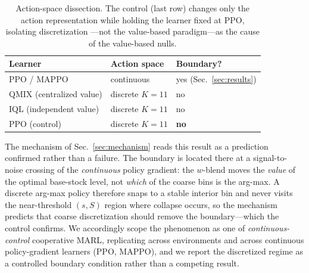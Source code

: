 \begin{table}[t]
\centering
\small
\begin{tabular}{lll}
\toprule
Learner & Action space & Boundary? \\
\midrule
PPO / MAPPO              & continuous   & yes (Sec.~\ref{sec:results}) \\
QMIX (centralized value) & discrete $K{=}11$ & no \\
IQL (independent value)  & discrete $K{=}11$ & no \\
PPO (control)            & discrete $K{=}11$ & \textbf{no} \\
\bottomrule
\end{tabular}
\caption{Action-space dissection. The control (last row) changes only the action
representation while holding the learner fixed at PPO, isolating discretization
---not the value-based paradigm---as the cause of the value-based nulls.}
\label{tab:action_dissection}
\end{table}

The mechanism of Sec.~\ref{sec:mechanism} reads this result as a prediction
confirmed rather than a failure. The boundary is located there at a
signal-to-noise crossing of the \emph{continuous} policy gradient: the $w$-blend
moves the \emph{value} of the optimal base-stock level, not \emph{which} of the
coarse bins is the arg-max. A discrete arg-max policy therefore snaps to a stable
interior bin and never visits the near-threshold $(s,S)$ region where collapse
occurs, so the mechanism predicts that coarse discretization should remove the
boundary---which the control confirms. We accordingly scope the phenomenon as one
of \emph{continuous-control} cooperative MARL, replicating across environments and
across continuous policy-gradient learners (PPO, MAPPO), and we report the
discretized regime as a controlled boundary condition rather than a competing
result.
